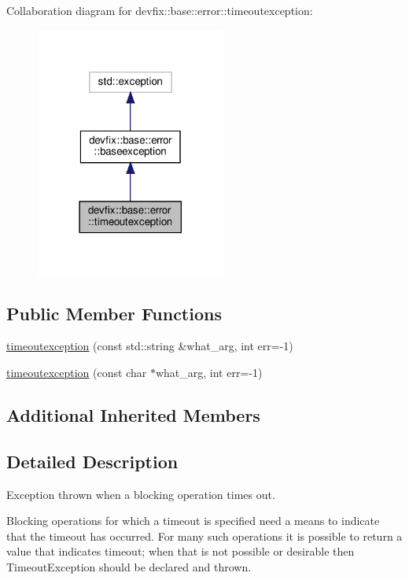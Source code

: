 Collaboration diagram for devfix\+:\+:base\+:\+:error\+:\+:timeoutexception\+:\nopagebreak
\begin{figure}[H]
\begin{center}
\leavevmode
\includegraphics[width=177pt]{structdevfix_1_1base_1_1error_1_1timeoutexception__coll__graph}
\end{center}
\end{figure}
\subsection*{Public Member Functions}
\begin{DoxyCompactItemize}
\item 
\hyperlink{structdevfix_1_1base_1_1error_1_1timeoutexception_abb684b432a5367385d8f975898226c8d}{timeoutexception} (const std\+::string \&what\+\_\+arg, int err=-\/1)
\item 
\hyperlink{structdevfix_1_1base_1_1error_1_1timeoutexception_a7096cca05d73ac6da75746d1737e1ec1}{timeoutexception} (const char $\ast$what\+\_\+arg, int err=-\/1)
\end{DoxyCompactItemize}
\subsection*{Additional Inherited Members}


\subsection{Detailed Description}
Exception thrown when a blocking operation times out. 

Blocking operations for which a timeout is specified need a means to indicate that the timeout has occurred. For many such operations it is possible to return a value that indicates timeout; when that is not possible or desirable then Timeout\+Exception should be declared and thrown. 

